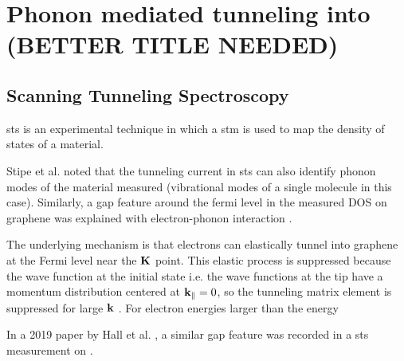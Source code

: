 \documentclass[main.tex]{subfiles}
\begin{document}
\chapter{Phonon mediated tunneling into \TaS (BETTER TITLE NEEDED)}

\section{Scanning Tunneling Spectroscopy}

\acrfull{sts} is an experimental technique in which a \acrfull{stm} is used to map the density of states of a material.


Stipe et al. noted that the tunneling current in \acrshort{sts} can also identify phonon modes of the material measured \cite{stipe_single-molecule_1998} (vibrational modes of a single molecule in this case).
Similarly, a gap feature around the fermi level in the measured DOS on graphene \cite{zhang_giant_2008} was explained with electron-phonon interaction \cite{wehling_phonon-mediated_2008}.

The underlying mechanism is that electrons can elastically tunnel into graphene at the Fermi level near the \(\vb{K}\) point. 
This elastic process is suppressed because the wave function at the initial state i.e. the wave functions at the tip have a momentum distribution centered at \(\vb{k}_{\parallel} = 0\), so the tunneling matrix element is suppressed for large \(\vb{k}\) \cite{vitali_phonon_2004}.
For electron energies larger than the energy 

In a 2019 paper by Hall et al. \cite{hall_environmental_2019}, a similar gap feature was recorded in a \acrshort{sts} measurement on \TaS.
\end{document}
